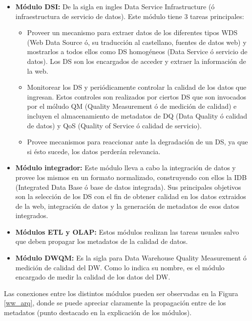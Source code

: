 \documentclass[a4paper,11pt]{article}
\begin{document}
    \begin{itemize}
      \item \textbf{Módulo DSI:} De la sigla en ingles Data Service Infrastructure (ó infraestructura de servicio de datos). Este módulo tiene 3 tareas
      principales:
        \begin{itemize}
          \item Proveer un mecanismo para extraer datos de los diferentes tipos WDS (Web Data Source ó, su traducción al castellano, fuentes de datos web) y
          mostrarlos a todos ellos como DS homogéneos (Data Service ó servicio de datos). Los DS son los encargados de acceder y extraer la información de la web.
          \item Monitorear los DS y periódicamente controlar la calidad de los datos que ingresan. Estos controles son realizados por ciertos DS que son
          invocados por el móludo QM (Quality Measurement ó de medición de calidad) e incluyen el almacenamiento de metadatos de DQ (Data Quality ó calidad de
          datos) y QoS (Quality of Service ó calidad de servicio).
          \item Provee mecanismos para reaccionar ante la degradación de un DS, ya que si ésto sucede, los datos perderán relevancia.
        \end{itemize}
      \item \textbf{Módulo integrador:} Este módulo lleva a cabo la integración de datos y provee los mismos en un formato normalizado, construyendo con ellos la
      IDB (Integrated Data Base ó base de datos integrada). Sus principales objetivos son la selección de los DS con el fin de obtener calidad en los datos
      extraidos de la web, integración de datos y la generación de metadatos de esos datos integrados.
      \item \textbf{Módulos ETL y OLAP:} Estos módulos realizan las tareas usuales salvo que deben propagar los metadatos de la calidad de datos.
      \item \textbf{Módulo DWQM:} Es la sigla para Data Warehouse Quality Measurement ó medición de calidad del DW. Como lo indica su nombre, es el módulo
      encargado de medir la calidad de los datos del DW.
    \end{itemize}
    
    Las conexiones entre los distintos módulos pueden ser observadas en la Figura \ref{ww_arq}, donde se puede apreciar claramente la propagación entre de los
    metadatos (punto destacado en la explicación de los módulos).
    
\end{document}

